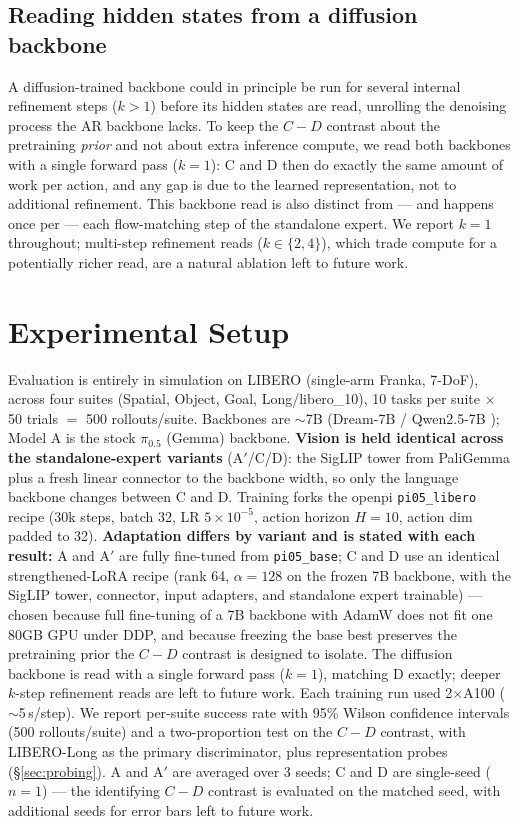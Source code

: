 \documentclass{article}
\begin{document}
\subsection{Reading hidden states from a diffusion backbone}
\label{sec:kread}
A diffusion-trained backbone could in principle be run for several internal
refinement steps ($k>1$) before its hidden states are read, unrolling the
denoising process the AR backbone lacks. To keep the $C-D$ contrast about the
pretraining \emph{prior} and not about extra inference compute, we read both
backbones with a single forward pass ($k{=}1$): C and D then do exactly the same
amount of work per action, and any gap is due to the learned representation, not
to additional refinement. This backbone read is also distinct from --- and
happens once per --- each flow-matching step of the standalone expert. We report
$k{=}1$ throughout; multi-step refinement reads ($k\in\{2,4\}$), which trade
compute for a potentially richer read, are a natural ablation left to future work.

\section{Experimental Setup}
Evaluation is entirely in simulation on LIBERO \cite{libero} (single-arm Franka,
7-DoF), across four suites (Spatial, Object, Goal, Long/libero\_10), 10 tasks per
suite $\times$ 50 trials $=$ 500 rollouts/suite. Backbones are $\sim$7B (Dream-7B
\cite{dream} / Qwen2.5-7B \cite{qwen25}); Model A is the stock $\pi_{0.5}$ (Gemma)
backbone. \textbf{Vision is held identical across the standalone-expert variants}
(A$'$/C/D): the SigLIP tower from PaliGemma plus a fresh linear connector to the
backbone width, so only the language backbone changes between C and D. Training
forks the openpi \texttt{pi05\_libero} recipe (30k steps, batch 32, LR $5\times
10^{-5}$, action horizon $H{=}10$, action dim padded to 32). \textbf{Adaptation
differs by variant and is stated with each result:} A and A$'$ are fully
fine-tuned from \texttt{pi05\_base}; C and D use an identical strengthened-LoRA
recipe (rank 64, $\alpha{=}128$ on the frozen 7B backbone, with the SigLIP tower,
connector, input adapters, and standalone expert trainable) --- chosen because
full fine-tuning of a 7B backbone with AdamW does not fit one 80GB GPU under DDP,
and because freezing the base best preserves the pretraining prior the $C-D$
contrast is designed to isolate. The diffusion backbone is read with a single
forward pass ($k{=}1$), matching D exactly; deeper $k$-step refinement reads are
left to future work. Each training run used 2$\times$A100 ($\sim$5\,s/step). We
report per-suite success rate with 95\% Wilson confidence intervals (500
rollouts/suite) and a two-proportion test on the $C-D$ contrast, with LIBERO-Long
as the primary discriminator, plus representation probes (\S\ref{sec:probing}). A
and A$'$ are averaged over 3 seeds; C and D are single-seed ($n{=}1$) --- the
identifying $C-D$ contrast is evaluated on the matched seed, with additional seeds
for error bars left to future work.
\end{document}
